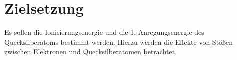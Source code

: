 
\section{Zielsetzung}
\label{sec:Zielsetzung}
Es sollen die Ionisierungsenergie und die 1. Anregungsenergie des Quecksilberatoms
 bestimmt werden. Hierzu werden die Effekte von Stößen zwischen Elektronen
 und Quecksilberatomen betrachtet.
